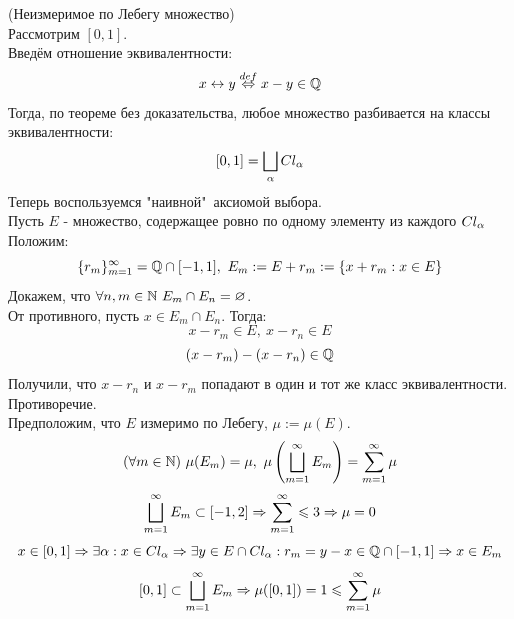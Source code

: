 \begin{example}(Неизмеримое по Лебегу множество)\\
	Рассмотрим $[0,1]$.\\
	Введём отношение эквивалентности: 
	\[x\leftrightarrow y\overset{def}{\Leftrightarrow} x-y\in\mathbb{Q}\] 
	Тогда, по теореме без доказательства, любое множество разбивается на классы эквивалентности: 
	\[[0,1]=\bigsqcup_\alpha Cl_\alpha\]
	Теперь воспользуемся "наивной"\ аксиомой выбора.\\
	Пусть $E$ - множество, содержащее ровно по одному элементу из каждого $Cl_\alpha$\\
	Положим:
	\[\{r_m\}_{m=1}^\i=\Q\cap[-1,1],\ E_m:=E+r_m:=\{x+r_m:x\in E\}\]
	Докажем, что $\forall n,m\in\mathbb{N}\ E_m\cap E_n=\varnothing$.\\
	От противного, пусть $x\in E_m\cap E_n$. Тогда:
	\[x-r_m\in E,\ x-r_n\in E\]
	\[(x-r_m)-(x-r_n)\in\mathbb{Q}\]
	Получили, что $x-r_n$ и $x-r_m$ попадают в один и тот же класс эквивалентности. Противоречие.\\
	Предположим, что $E$ измеримо по Лебегу, $\mu:=\mu(E)$.
	\[(\fa m\in\N)\ \mu(E_m)=\mu,\ \mu\l(\bsc_{m=1}^\i E_m\r)=\sum_{m=1}^\i\mu\]
	\[\bsc_{m=1}^\i E_m\subset[-1,2]\Ra\sum_{m=1}^\i\le3\Ra\mu=0\]
	\[x\in[0,1]\Rightarrow\exists\alpha:x\in Cl_\alpha\Rightarrow\exists y\in E\cap Cl_\alpha: r_m=y-x\in\mathbb{Q}\cap[-1,1]\Rightarrow x\in E_m\]
	\[[0,1]\subset\bsc_{m=1}^\i E_m\Ra\mu([0,1])=1\le\sum_{m=1}^\i\mu\]
\end{example}
